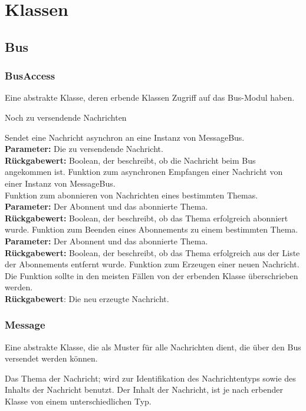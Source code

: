 \documentclass[entwurf.tex]{subfiles}
\begin{document}
  	
\chapter{Klassen}
	\section{Bus}
	\subsection{BusAccess}
	\label{Class:BusAccess} 
		Eine abstrakte Klasse, deren erbende Klassen Zugriff auf das Bus-Modul haben.
		\begin{description}
				Noch zu versendende Nachrichten
			
				Sendet eine Nachricht asynchron an eine Instanz von MessageBus.\\ 
				\textbf{Parameter:} Die zu versendende Nachricht.\\ 
				\textbf{Rückgabewert:} Boolean, der beschreibt, ob die Nachricht beim Bus angekommen ist.
				Funktion zum asynchronen Empfangen einer Nachricht von einer Instanz von MessageBus.\\ 
				Funktion zum abonnieren von Nachrichten eines bestimmten Themas.\\ 
				\textbf{Parameter:} Der Abonnent und das abonnierte Thema.\\ 
				\textbf{Rückgabewert:} Boolean, der beschreibt, ob das Thema erfolgreich abonniert wurde.
				Funktion zum Beenden eines Abonnements zu einem bestimmten Thema.\\ 
				\textbf{Parameter:} Der Abonnent und das abonnierte Thema.\\ 
				\textbf{Rückgabewert:} Boolean, der beschreibt, ob das Thema erfolgreich aus der Liste der Abonnements entfernt wurde.
				Funktion zum Erzeugen einer neuen Nachricht. Die Funktion sollte in den meisten Fällen von der erbenden Klasse überschrieben werden. \\
				\textbf{Rückgabewert}: Die neu erzeugte Nachricht.
		\end{description}
  		
	\subsection{Message}
	\label{Class:Message} 
		Eine abstrakte Klasse, die als Muster für alle Nachrichten dient, die über den Bus versendet werden können.
		\begin{description}
			\attr{protected topic: Topic}  
				Das Thema der Nachricht; wird zur Identifikation des Nachrichtentyps sowie des Inhalts der Nachricht benutzt.
			\attr{Inhalt}
				Der Inhalt der Nachricht, ist je nach erbender Klasse von einem unterschiedlichen Typ.
		\end{description}
\end{document}

